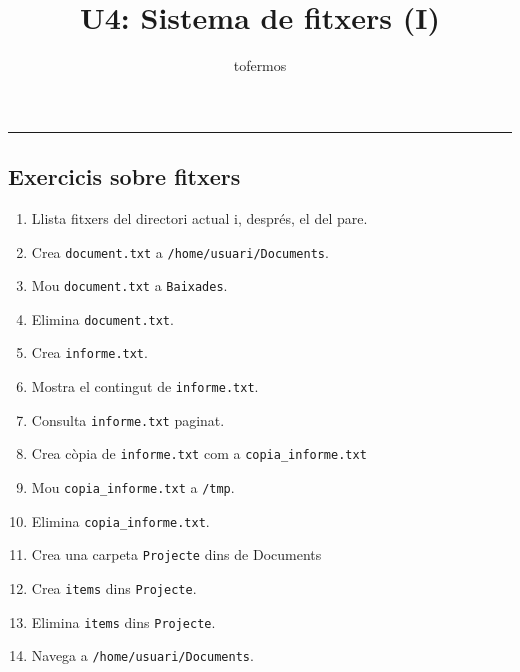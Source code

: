 \documentclass[
  12 pt,
  a4paper,
]{article}
\title{U4: Sistema de fitxers (I)}
\author{tofermos}
\date{}
\providecommand{\tightlist}{%
  \setlength{\itemsep}{0pt}\setlength{\parskip}{0pt}}
\begin{document}
\maketitle

{
\setcounter{tocdepth}{2}
\tableofcontents
}
\newpage
\renewcommand\tablename{Tabla}

\begin{center}\rule{0.5\linewidth}{0.5pt}\end{center}

\subsection{Exercicis sobre fitxers}\label{exercicis-sobre-fitxers}

\begin{enumerate}
\def\labelenumi{\arabic{enumi}.}
\tightlist
\item
  Llista fitxers del directori actual i, després, el del pare.
\item
  Crea \texttt{document.txt} a \texttt{/home/usuari/Documents}.\\
\item
  Mou \texttt{document.txt} a \texttt{Baixades}.\\
\item
  Elimina \texttt{document.txt}.\\
\item
  Crea \texttt{informe.txt}.\\
\item
  Mostra el contingut de \texttt{informe.txt}.\\
\item
  Consulta \texttt{informe.txt} paginat.
\item
  Crea còpia de \texttt{informe.txt} com a \texttt{copia\_informe.txt}
\item
  Mou \texttt{copia\_informe.txt} a \texttt{/tmp}.\\
\item
  Elimina \texttt{copia\_informe.txt}.\\
\item
  Crea una carpeta \texttt{Projecte} dins de Documents
\item
  Crea \texttt{items} dins \texttt{Projecte}.\\
\item
  Elimina \texttt{items} dins \texttt{Projecte}.\\
\item
  Navega a \texttt{/home/usuari/Documents}.\\

\end{enumerate}
\end{document}
